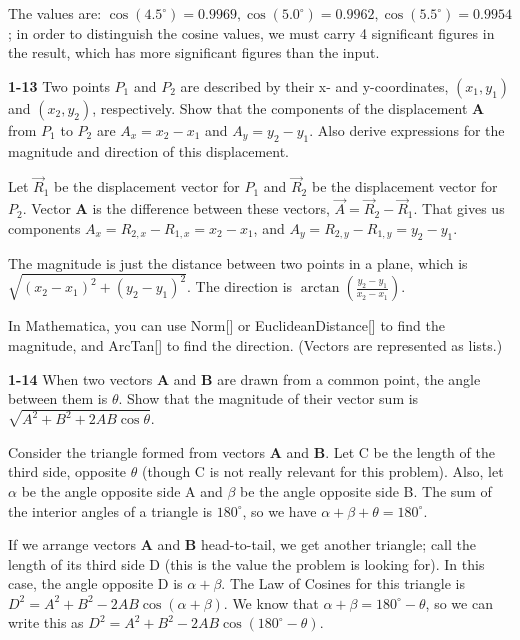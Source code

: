 \documentclass{amsart}
\begin{document}
The values are: $\cos(4.5^{\circ}) = 0.9969, \cos(5.0^{\circ}) = 0.9962, \cos(5.5^{\circ}) = 0.9954$;
in order to distinguish the cosine values, we must carry 4 significant figures in the result,
which has more significant figures than the input.

\textbf{1-13} Two points $P_{1}$ and $P_{2}$ are described by their x- and y-coordinates,
$(x_{1}, y_{1})$ and $(x_{2}, y_{2})$, respectively.
Show that the components of the displacement
\textbf{A} from $P_{1}$ to $P_{2}$ are $A_{x} = x_{2}-x_{1}$ and $A_{y} = y_{2}-y_{1}$.
Also derive expressions for the magnitude and direction of this displacement.

Let $\vec R_{1}$ be the displacement vector for $P_{1}$ and $\vec R_{2}$ be the displacement
vector for $P_{2}$.  Vector \textbf{A} is the difference between these vectors,
$\vec A = \vec R_{2} - \vec R_{1}$.
That gives us components $A_{x} = R_{2,x} - R_{1,x} = x_{2} - x_{1}$, and
$A_{y} = R_{2,y} - R_{1,y} = y_{2} - y_{1}$.

The magnitude is just the distance between two points in a plane, which is
$\sqrt{(x_{2}-x_{1})^{2}+(y_{2}-y_{1})^{2}}$.
The direction is $\arctan(\frac{y_{2}-y_{1}}{x_{2}-x_{1}})$.

In Mathematica, you can use Norm[] or EuclideanDistance[] to find the magnitude,
and ArcTan[] to find the direction.  (Vectors are represented as lists.)

\textbf{1-14} When two vectors \textbf{A} and \textbf{B} are drawn from a common point,
the angle between them is $\theta$.
Show that the magnitude of their vector sum is $\sqrt{A^{2}+B^{2}+2 A B \cos \theta}$.

Consider the triangle formed from vectors \textbf{A} and \textbf{B}.  Let C be the length
of the third side, opposite $\theta$ (though C is not really relevant for this problem).
Also, let $\alpha$ be the angle opposite side A
and $\beta$ be the angle opposite side B.
The sum of the interior angles of a triangle is $180^{\circ}$, so we have $\alpha + \beta + \theta = 180^{\circ}$.

If we arrange vectors \textbf{A} and \textbf{B} head-to-tail, we get another triangle;
call the length of its third side D (this is the value the problem is looking for).
  In this case, the angle opposite D is $\alpha + \beta$.
The Law of Cosines for this triangle is $D^2 = A^2+B^2-2 A B \cos (\alpha + \beta)$.
We know that $\alpha + \beta = 180^\circ - \theta$, so we can write this as $D^2 = A^2+B^2-2 A B \cos (180^\circ - \theta)$.
\end{document}
